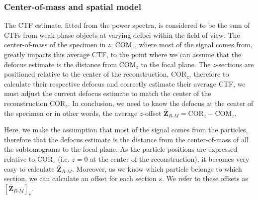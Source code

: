 

\subsubsection{Center-of-mass and spatial model} \label{sec:algo:ctf_3d:spatial_model}

The CTF estimate, fitted from the power spectra, is considered to be the sum of CTFs from weak phase objects at varying defoci within the field of view. The center-of-mass of the specimen in $z$, $\bm{\mathrm{COM}}_z$, where most of the signal comes from, greatly impacts this average CTF, to the point where we can assume that the defocus estimate is the distance from $\bm{\mathrm{COM}}_z$ to the focal plane. The $z$-sections are positioned relative to the center of the reconstruction, $\bm{\mathrm{COR}}_z$, therefore to calculate their respective defocus and correctly estimate their average CTF, we must adjust the current defocus estimate to match the center of the reconstruction $\bm{\mathrm{COR}}_z$. In conclusion, we need to know the defocus at the center of the specimen or in other words, the average $z$-offset $\bm{\bar{Z}}_{R\text{-}M} = \bm{\mathrm{COR}}_z - \bm{\mathrm{COM}}_z$.

Here, we make the assumption that most of the signal comes from the particles, therefore that the defocus estimate is the distance from the center-of-mass of all the subtomograms to the focal plane. As the particle positions are expressed relative to $\bm{\mathrm{COR}}_z$ (i.e. $z=0$ at the center of the reconstruction), it becomes very easy to calculate $\bm{\bar{Z}}_{R\text{-}M}$. Moreover, as we know which particle belongs to which section, we can calculate an offset for each section $s$. We refer to these offsets as ${[\bm{\bar{Z}}_{R\text{-}M}]}_{s}$.

